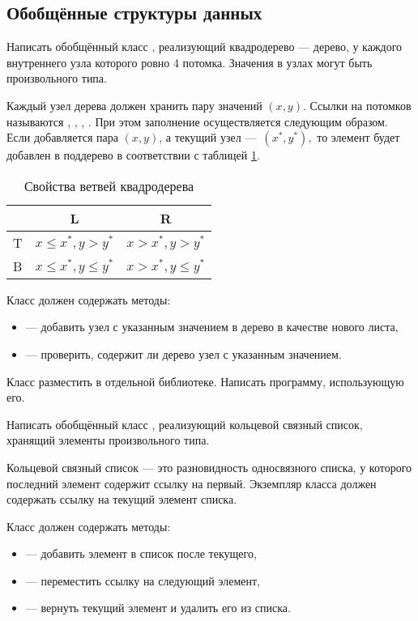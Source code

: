 
\subsection{Обобщённые структуры данных}

\task Написать обобщённый класс , реализующий
квадродерево — дерево, у каждого внутреннего узла
которого ровно 4 потомка. Значения в узлах могут быть произвольного
типа.

Каждый узел дерева должен хранить пару значений $(x,y)$. Ссылки на
потомков называются , , , . При этом
заполнение осуществляется следующим образом. Если добавляется пара
$(x, y)$, а текущий узел — $(x^*,y^*),$ то элемент будет добавлен в
поддерево в соответствии с таблицей \ref{table:QuadTree}.

\begin{table}[b]
  \centering
  \begin{tabular}{c|cc}
      & L   &R\\
    \hline
    T & $x \leqslant x^*, y > y^*$         & $x > x^*, y > y^*$\\
    B & $x \leqslant x^*, y \leqslant y^*$ & $x > x^*, y \leqslant y^*$
  \end{tabular}
\caption{Свойства ветвей квадродерева}\label{table:QuadTree}
\end{table}

Класс должен содержать методы:
\begin{itemize}
\item {} — добавить узел с указанным значением в дерево в
  качестве нового листа,
\item {} — проверить, содержит ли дерево узел с указанным
  значением.
\end{itemize}

Класс разместить в отдельной библиотеке. Написать программу,
использующую его.

\task Написать обобщённый класс , реализующий
кольцевой связный список, хранящий
элементы произвольного типа.

Кольцевой связный список — это разновидность односвязного списка, у
которого последний элемент содержит ссылку на первый. Экземпляр класса
должен содержать ссылку на текущий элемент списка.

Класс должен содержать методы:
\begin{itemize}
\item {} — добавить элемент в список после текущего,
\item {} — переместить ссылку на следующий элемент,
\item {} — вернуть текущий элемент и удалить его из списка.
\end{itemize}

